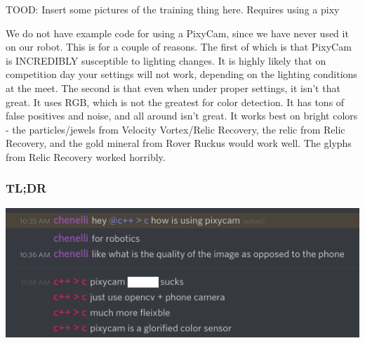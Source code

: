 \documentclass[../main.tex]{subfiles}
\begin{document}
TOOD: Insert some pictures of the training thing here. Requires using a pixy

We do not have example code for using a PixyCam, since we have never used it on our robot. This is for a couple of reasons. The first of which is that PixyCam is INCREDIBLY susceptible to lighting changes. It is highly likely that on competition day your settings will not work, depending on the lighting conditions at the meet. The second is that even when under proper settings, it isn't that great. It uses RGB, which is not the greatest for color detection. It has tons of false positives and noise, and all around isn't great. It works best on bright colors - the particles/jewels from Velocity Vortex/Relic Recovery, the relic from Relic Recovery, and the gold mineral from Rover Ruckus would work well. The glyphs from Relic Recovery worked horribly. 

\subsubsection{TL;DR}
\includegraphics[width=400pt]{sections/vision/images/2019-02-27-195334_3840x1080_scrot_cropped.png}
\end{document}
